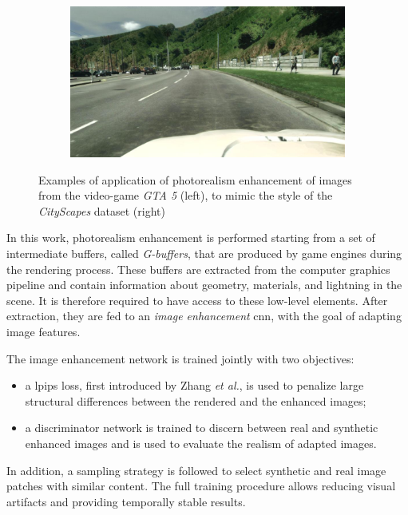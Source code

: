 \documentclass[%
    corpo=12pt,
    twoside,
    stile=classica,   
    tipotesi=magistrale,
    evenboxes,
    english,
	numerazioneromana,
]{toptesi}
\begin{document}
\begin{figure}[ht!]
\begin{subfigure}{.47\textwidth}
	\end{subfigure}%
	\hspace{.02\linewidth}
	\begin{subfigure}{.47\textwidth}
		\centering
		\includegraphics[width=\textwidth]{imgs/res2.jpg}
	\end{subfigure}
	\caption{Examples of application of photorealism enhancement of images from the video-game \textit{GTA 5} (left), to mimic the style of the \textit{CityScapes} dataset (right)\cite{richter2021enhancing}}
	\label{fig:photorealism}
\end{figure}

In this work, photorealism enhancement is performed starting from a set of intermediate buffers, called \textit{G-buffers}, that are produced by game engines during the rendering process. These buffers are extracted from the computer graphics pipeline and contain information about geometry, materials, and lightning in the scene. It is therefore required to have access to these low-level elements. After extraction, they are fed to an \textit{image enhancement} \gls{cnn}, with the goal of adapting image features.

\medskip
The image enhancement network is trained jointly with two objectives:
\begin{itemize}
	\item a \gls{lpips} loss, first introduced by Zhang \textit{et al.}\cite{zhang2018unreasonable}, is used to penalize large structural differences between the rendered and the enhanced images;
	\item a discriminator network is trained to discern between real and synthetic enhanced images and is used to evaluate the realism of adapted images.
\end{itemize}

In addition, a sampling strategy is followed to select synthetic and real image patches with similar content. The full training procedure allows reducing visual artifacts and providing temporally stable results.
\end{document}

